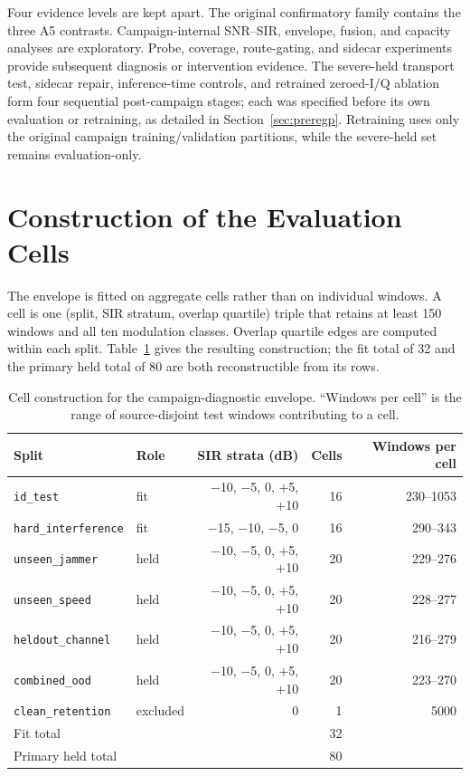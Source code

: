 \documentclass[letterpaper,onecolumn,11pt,journal]{IEEEtran}
\begin{document}
Four evidence levels are kept apart. The original confirmatory family contains
the three A5 contrasts. Campaign-internal SNR--SIR, envelope, fusion, and
capacity analyses are exploratory. Probe, coverage, route-gating, and sidecar
experiments provide subsequent diagnosis or intervention evidence. The
severe-held transport test, sidecar repair, inference-time controls, and
retrained zeroed-I/Q ablation form four sequential post-campaign stages; each
was specified before its own evaluation or retraining, as detailed in
Section~\ref{sec:preregp}. Retraining uses only the original campaign
training/validation partitions, while the severe-held set remains
evaluation-only.

\section{Construction of the Evaluation Cells}
The envelope is fitted on aggregate cells rather than on individual windows. A
cell is one (split, SIR stratum, overlap quartile) triple that retains at least
150 windows and all ten modulation classes. Overlap quartile edges are computed
within each split. Table~\ref{tab:cells} gives the resulting construction; the
fit total of 32 and the primary held total of 80 are both reconstructible from
its rows.

\begin{table}[t]
\centering
\caption{Cell construction for the campaign-diagnostic envelope. ``Windows per cell'' is
the range of \mbox{source-disjoint} test windows contributing to a cell.}
\label{tab:cells}
\footnotesize
\setlength{\tabcolsep}{3pt}
\begin{tabular}{llrrr}
\toprule
Split & Role & SIR strata (dB) & Cells & Windows per cell\\
\midrule
\texttt{id\_test} & fit & $-$10, $-$5, 0, $+$5, $+$10 & 16 & 230--1053\\
\texttt{hard\_interference} & fit & $-$15, $-$10, $-$5, 0 & 16 & 290--343\\
\texttt{unseen\_jammer} & held & $-$10, $-$5, 0, $+$5, $+$10 & 20 & 229--276\\
\texttt{unseen\_speed} & held & $-$10, $-$5, 0, $+$5, $+$10 & 20 & 228--277\\
\texttt{heldout\_channel} & held & $-$10, $-$5, 0, $+$5, $+$10 & 20 & 216--279\\
\texttt{combined\_ood} & held & $-$10, $-$5, 0, $+$5, $+$10 & 20 & 223--270\\
\texttt{clean\_retention} & excluded & $0$ & 1 & 5000\\
\midrule
\multicolumn{3}{l}{Fit total} & 32 & \\
\multicolumn{3}{l}{Primary held total} & 80 & \\
\bottomrule
\end{tabular}
\end{table}
\end{document}
